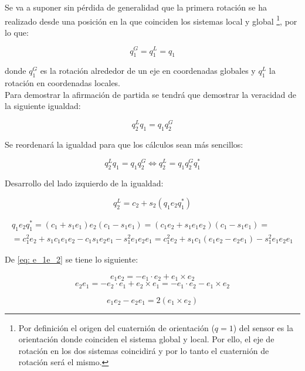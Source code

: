 \documentclass[12pt, a4paper]{report}
\begin{document}
Se va a suponer sin pérdida de generalidad que la primera rotación se ha realizado desde una posición en la que coinciden los sistemas local y global  \footnote{Por definición el origen del  cuaternión de orientación ($q = 1$) del sensor es la orientación donde coinciden el sistema global y local. Por ello, el eje de rotación en los dos sistemas coincidirá y por lo tanto el cuaternión de rotación será el mismo.}, por lo que:

\begin{equation}
q_1^G = q_1^L = q_1
\end{equation}

donde $q_1^G$ es la rotación alrededor de un eje en coordenadas globales y $q_1^L$ la rotación en coordenadas locales.\\

Para demostrar la afirmación de partida se tendrá que demostrar la veracidad de la siguiente igualdad:

\begin{equation}
q_2^Lq_1 = q_1q_2^G
\end{equation}

Se reordenará la igualdad para que los cálculos sean más sencillos:

\begin{equation} \label{eq: E01}
q_2^Lq_1 = q_1q_2^G \iff q_2^L = q_1q_2^Gq_1^*
\end{equation}

Desarrollo del lado izquierdo de la igualdad:

\begin{equation} \label{eq: q_2I}
q_2^L = c_2 + s_2(q_1e_2q_1^*)
\end{equation}

\begin{multline} \label{eq: q_1e_2q_1}
q_1e_2q_1^* = (c_1 + s_1e_1)e_2(c_1 - s_1e_1) = (c_1e_2 + s_1e_1e_2)(c_1 - s_1e_1) = \\
= c_1^2e_2 + s_1c_1e_1e_2 - c_1s_1e_2e_1 - s_1^2e_1e_2e_1 = c_1^2e_2 + s_1c_1(e_1e_2 - e_2e_1) - s_1^2e_1e_2e_1
\end{multline}

De \eqref{eq: e_1e_2} se tiene lo siguiente:

$$ e_1e_2 = -e_1 \cdot e_2 + e_1 \times e_2 $$
$$ e_2e_1 = -e_2 \cdot e_1 + e_2 \times e_1 = -e_1 \cdot e_2 - e_1 \times e_2 $$

\begin{equation} \label{eq: e_1e_2e_2e_1}
e_1 e_2 - e_2 e_1 = 2(e_1 \times e_2)
\end{equation}
\end{document}
